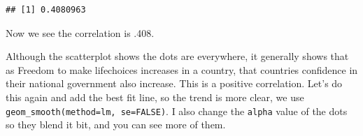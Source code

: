 \documentclass[]{book}
\newenvironment{Shaded}{\begin{snugshade}}{\end{snugshade}}
\newcommand{\KeywordTok}[1]{\textcolor[rgb]{0.13,0.29,0.53}{\textbf{{#1}}}}
\newcommand{\DataTypeTok}[1]{\textcolor[rgb]{0.13,0.29,0.53}{{#1}}}
\newcommand{\StringTok}[1]{\textcolor[rgb]{0.31,0.60,0.02}{{#1}}}
\newcommand{\NormalTok}[1]{{#1}}
\theoremstyle{definition}
\theoremstyle{definition}
\theoremstyle{definition}
\theoremstyle{remark}
\begin{document}
\begin{Shaded}
\end{Shaded}

\begin{verbatim}
## [1] 0.4080963
\end{verbatim}

Now we see the correlation is .408.

Although the scatterplot shows the dots are everywhere, it generally
shows that as Freedom to make lifechoices increases in a country, that
countries confidence in their national government also increase. This is
a positive correlation. Let's do this again and add the best fit line,
so the trend is more clear, we use
\texttt{geom\_smooth(method=lm,\ se=FALSE)}. I also change the
\texttt{alpha} value of the dots so they blend it bit, and you can see
more of them.
\end{document}
